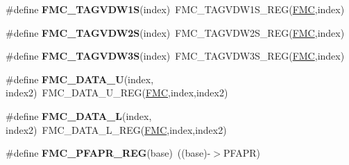 \begin{DoxyCompactItemize}
\item 
\#define {\bfseries F\+M\+C\+\_\+\+T\+A\+G\+V\+D\+W1S}(index)~F\+M\+C\+\_\+\+T\+A\+G\+V\+D\+W1\+S\+\_\+\+R\+EG(\hyperlink{group__FMC__Peripheral__Access__Layer_ga970254e6dadedc433f57d43709636664}{F\+MC},index)\hypertarget{group__FMC__Register__Accessor__Macros_gadcbd467777503e44b998be1375b14daf}{}\label{group__FMC__Register__Accessor__Macros_gadcbd467777503e44b998be1375b14daf}

\item 
\#define {\bfseries F\+M\+C\+\_\+\+T\+A\+G\+V\+D\+W2S}(index)~F\+M\+C\+\_\+\+T\+A\+G\+V\+D\+W2\+S\+\_\+\+R\+EG(\hyperlink{group__FMC__Peripheral__Access__Layer_ga970254e6dadedc433f57d43709636664}{F\+MC},index)\hypertarget{group__FMC__Register__Accessor__Macros_ga08a172b0ee7228b03453ec0dfecf081c}{}\label{group__FMC__Register__Accessor__Macros_ga08a172b0ee7228b03453ec0dfecf081c}

\item 
\#define {\bfseries F\+M\+C\+\_\+\+T\+A\+G\+V\+D\+W3S}(index)~F\+M\+C\+\_\+\+T\+A\+G\+V\+D\+W3\+S\+\_\+\+R\+EG(\hyperlink{group__FMC__Peripheral__Access__Layer_ga970254e6dadedc433f57d43709636664}{F\+MC},index)\hypertarget{group__FMC__Register__Accessor__Macros_gad7465a3ae84cfdb0bec808294dbfd388}{}\label{group__FMC__Register__Accessor__Macros_gad7465a3ae84cfdb0bec808294dbfd388}

\item 
\#define {\bfseries F\+M\+C\+\_\+\+D\+A\+T\+A\+\_\+U}(index,  index2)~F\+M\+C\+\_\+\+D\+A\+T\+A\+\_\+\+U\+\_\+\+R\+EG(\hyperlink{group__FMC__Peripheral__Access__Layer_ga970254e6dadedc433f57d43709636664}{F\+MC},index,index2)\hypertarget{group__FMC__Register__Accessor__Macros_gaa109b4be3b81d18c8d2c5b9afa04ff6f}{}\label{group__FMC__Register__Accessor__Macros_gaa109b4be3b81d18c8d2c5b9afa04ff6f}

\item 
\#define {\bfseries F\+M\+C\+\_\+\+D\+A\+T\+A\+\_\+L}(index,  index2)~F\+M\+C\+\_\+\+D\+A\+T\+A\+\_\+\+L\+\_\+\+R\+EG(\hyperlink{group__FMC__Peripheral__Access__Layer_ga970254e6dadedc433f57d43709636664}{F\+MC},index,index2)\hypertarget{group__FMC__Register__Accessor__Macros_gab67d123b384d58b8f86096b79e1f06f6}{}\label{group__FMC__Register__Accessor__Macros_gab67d123b384d58b8f86096b79e1f06f6}

\item 
\#define {\bfseries F\+M\+C\+\_\+\+P\+F\+A\+P\+R\+\_\+\+R\+EG}(base)~((base)-\/$>$P\+F\+A\+PR)\hypertarget{group__FMC__Register__Accessor__Macros_ga7665629e583f9fcadd41da61df6f735a}{}\label{group__FMC__Register__Accessor__Macros_ga7665629e583f9fcadd41da61df6f735a}


\end{DoxyCompactItemize}
